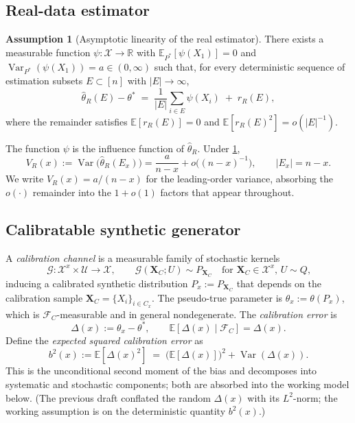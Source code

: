 \documentclass[11pt]{article}
\theoremstyle{plain}
\theoremstyle{definition}
\newtheorem{assumption}{Assumption}[section]
\theoremstyle{remark}
\newcommand{\R}{\mathbb{R}}
\newcommand{\E}{\mathbb{E}}
\newcommand{\Var}{\operatorname{Var}}
\begin{document}
\subsection{Real-data estimator}
\label{ssec:real}

\begin{assumption}[Asymptotic linearity of the real estimator]\label{asm:al-real}
There exists a measurable function $\psi:\mathcal{X}\to\R$ with $\E_{P^*}[\psi(X_1)]=0$ and $\Var_{P^*}(\psi(X_1))=a\in(0,\infty)$ such that, for every deterministic sequence of estimation subsets $E\subset[n]$ with $|E|\to\infty$,
\begin{equation}\label{eq:al-real}
\hat\theta_R(E)-\theta^*\;=\;\frac{1}{|E|}\sum_{i\in E}\psi(X_i)\;+\;r_R(E),
\end{equation}
where the remainder satisfies $\E[r_R(E)]=0$ and $\E[r_R(E)^2]=o(|E|^{-1})$.
\end{assumption}

The function $\psi$ is the influence function of $\hat\theta_R$. Under \cref{asm:al-real},
\begin{equation}
V_R(x):=\Var\bigl(\hat\theta_R(E_x)\bigr)=\frac{a}{n-x}+o\bigl((n-x)^{-1}\bigr),\qquad |E_x|=n-x.
\end{equation}
We write $V_R(x)=a/(n-x)$ for the leading-order variance, absorbing the $o(\cdot)$ remainder into the $1+o(1)$ factors that appear throughout.

\subsection{Calibratable synthetic generator}
\label{ssec:generator}

A \emph{calibration channel} is a measurable family of stochastic kernels
\begin{equation}
\mathcal{G}:\mathcal{X}^{x}\times\mathcal{U}\to\mathcal{X},\qquad \mathcal{G}(\bm{X}_C;U)\sim P_{\bm{X}_C}\quad\text{for $\bm{X}_C\in\mathcal{X}^x$, $U\sim Q$,}
\end{equation}
inducing a calibrated synthetic distribution $P_x:=P_{\bm{X}_C}$ that depends on the calibration sample $\bm{X}_C=\{X_i\}_{i\in C_x}$. The pseudo-true parameter is $\theta_x:=\theta(P_x)$, which is $\mathcal{F}_C$-measurable and in general nondegenerate. The \emph{calibration error} is
\begin{equation}
\Delta(x):=\theta_x-\theta^*,\qquad \E[\Delta(x)\mid\mathcal{F}_C]=\Delta(x).
\end{equation}
Define the \emph{expected squared calibration error} as
\begin{equation}\label{eq:bsq-def}
b^2(x):=\E[\Delta(x)^2]\;=\;\bigl(\E[\Delta(x)]\bigr)^2+\Var(\Delta(x)).
\end{equation}
This is the unconditional second moment of the bias and decomposes into systematic and stochastic components; both are absorbed into the working model below. (The previous draft conflated the random $\Delta(x)$ with its $L^2$-norm; the working assumption is on the deterministic quantity $b^2(x)$.)
\end{document}
